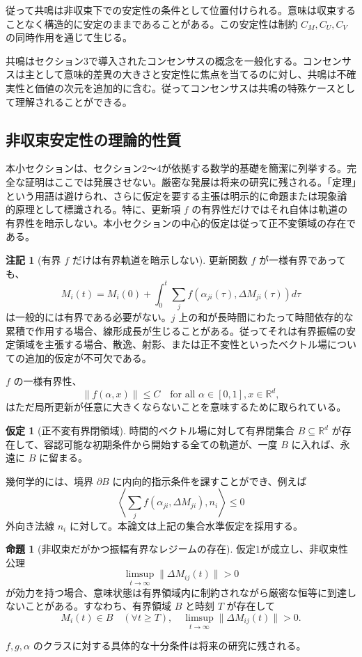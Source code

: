 \documentclass[11pt,a4paper]{article}
\theoremstyle{definition}
\newtheorem{proposition}{命題}[section]
\newtheorem{assumption}{仮定}[section]
\newtheorem{remark}{注記}[section]
\begin{document}
従って共鳴は非収束下での安定性の条件として位置付けられる。意味は収束することなく構造的に安定のままであることがある。この安定性は制約 $C_M, C_U, C_V$ の同時作用を通じて生じる。

共鳴はセクション3で導入されたコンセンサスの概念を一般化する。コンセンサスは主として意味的差異の大きさと安定性に焦点を当てるのに対し、共鳴は不確実性と価値の次元を追加的に含む。従ってコンセンサスは共鳴の特殊ケースとして理解されることができる。

\subsection{非収束安定性の理論的性質}

本小セクションは、セクション2～4が依拠する数学的基礎を簡潔に列挙する。完全な証明はここでは発展させない。厳密な発展は将来の研究に残される。「定理」という用語は避けられ、さらに仮定を要する主張は明示的に命題または現象論的原理として標識される。特に、更新項 $f$ の有界性だけではそれ自体は軌道の有界性を暗示しない。本小セクションの中心的仮定は従って正不変領域の存在である。

\begin{remark}[有界 $f$ だけは有界軌道を暗示しない]
更新関数 $f$ が一様有界であっても、
\[
M_i(t) = M_i(0) + \int_0^t \sum_j f(\alpha_{ji}(\tau), \Delta M_{ji}(\tau)) d\tau
\]
は一般的には有界である必要がない。$j$ 上の和が長時間にわたって時間依存的な累積で作用する場合、線形成長が生じることがある。従ってそれは有界振幅の安定領域を主張する場合、散逸、射影、または正不変性といったベクトル場についての追加的仮定が不可欠である。

$f$ の一様有界性、
\[
\|f(\alpha, x)\| \leq C \quad \text{for all } \alpha \in [0,1], x \in \mathbb{R}^d,
\]
はただ局所更新が任意に大きくならないことを意味するために取られている。
\end{remark}

\begin{assumption}[正不変有界閉領域]
時間的ベクトル場に対して有界閉集合 $B \subseteq \mathbb{R}^d$ が存在して、容認可能な初期条件から開始する全ての軌道が、一度 $B$ に入れば、永遠に $B$ に留まる。

幾何学的には、境界 $\partial B$ に内向的指示条件を課すことができ、例えば
\[
\left\langle \sum_j f(\alpha_{ji}, \Delta M_{ji}), n_i \right\rangle \leq 0
\]
外向き法線 $n_i$ に対して。本論文は上記の集合水準仮定を採用する。
\end{assumption}

\begin{proposition}[非収束だがかつ振幅有界なレジームの存在]
仮定1が成立し、非収束性公理
\[
\limsup_{t \to \infty} \|\Delta M_{ij}(t)\| > 0
\]
が効力を持つ場合、意味状態は有界領域内に制約されながら厳密な恒等に到達しないことがある。すなわち、有界領域 $B$ と時刻 $T$ が存在して
\[
M_i(t) \in B \quad (\forall t \geq T), \quad \limsup_{t \to \infty} \|\Delta M_{ij}(t)\| > 0.
\]

$f, g, \alpha$ のクラスに対する具体的な十分条件は将来の研究に残される。
\end{proposition}
\end{document}
